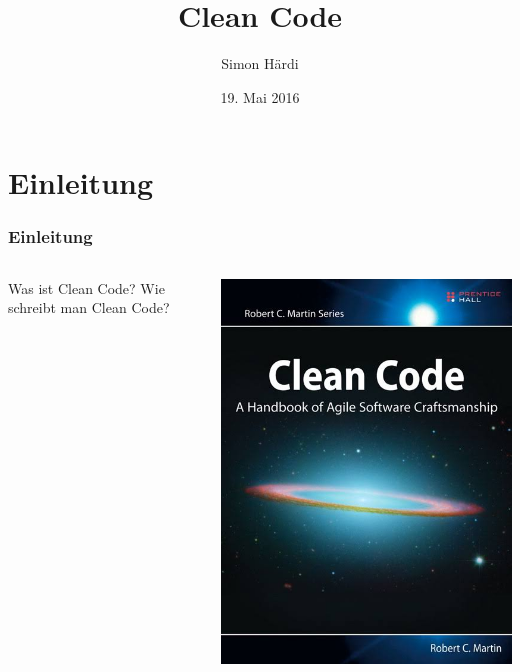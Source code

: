 \documentclass{beamer}
\title[CleanCode]{Clean Code}
\author{Simon Härdi}
\institute{Institute for Computational Engineering}
\date{19. Mai 2016}
\begin{document}
{
\begin{frame}
\maketitle
\end{frame}
}


\section{Einleitung}

\begin{frame}
\frametitle{Einleitung}
\begin{columns}
    \begin{column}{0.6\textwidth}
        \begin{outline}
            \1 Was ist Clean Code?
            \1[]
            \1 Wie schreibt man Clean Code?
        \end{outline}
    \end{column}
    \begin{column}{0.4\textwidth}
        \includegraphics[width=\linewidth]{cleanCodeBook.jpg}
    \end{column}
\end{columns}
\end{frame}
\end{document}
